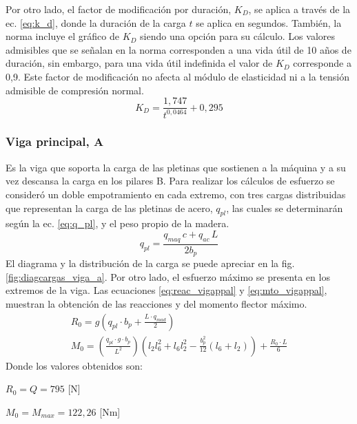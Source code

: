 Por otro lado, el factor de modificación por duración, $K_D$, se aplica a través de la ec. \ref{eq:k_d}, donde la duración de la carga $t$ se aplica en segundos. También, la norma incluye el gráfico de $K_D$ siendo una opción para su cálculo. Los valores admisibles que se señalan en la norma corresponden a una vida útil de 10 años de duración, sin embargo, para una vida útil indefinida el valor de $K_D$ corresponde a 0,9. Este factor de modificación no afecta al módulo de elasticidad ni a la tensión admisible de compresión normal.
\begin{equation} \label{eq:k_d}
	K_D = \frac{1,747}{t^{0,0464}} + 0,295
\end{equation}

\subsubsection{Viga principal, A}
Es la viga que soporta la carga de las pletinas que sostienen a la máquina y a su vez descansa la carga en los pilares B. Para realizar los cálculos de esfuerzo se consideró un doble empotramiento en cada extremo, con tres cargas distribuidas que representan la carga de las pletinas de acero, $q_{pl}$, las cuales se determinarán según la ec. \ref{eq:q_pl}, y el peso propio de la madera.
\begin{equation}\label{eq:q_pl}
	q_{pl} = \frac{q_{maq}\,c + q_{ac}\,L}{2b_p}
\end{equation}
El diagrama y la distribución de la carga se puede apreciar en la fig. \ref{fig:diagcargas_viga_a}. Por otro lado, el esfuerzo máximo se presenta en los extremos de la viga. Las ecuaciones \ref{eq:reac_vigappal} y \ref{eq:mto_vigappal}, muestran la obtención de las reacciones y del momento flector máximo.
\begin{subequations}
\begin{gather}
	R_0 = g \left( q_{pl}\cdot b_p + \frac{L\cdot q_{mad}}{2}\right) \label{eq:reac_vigappal}\\
	M_0 = \left(\frac{q_{pl}\cdot g\cdot b_p}{L^2}\right) \left(l_2 l_6^2 + l_6 l_2^2 - \frac{b_p^2}{12}\left( l_6 + l_2\right) \right) + \frac{R_0\cdot L}{6} \label{eq:mto_vigappal} 
\end{gather}
\end{subequations}
Donde los valores obtenidos son:
\begin{itemize*}
	\item $R_0 = Q = 795$ [N]
	\item $M_0 = M_{max} = 122,26$ [Nm]
\end{itemize*}
